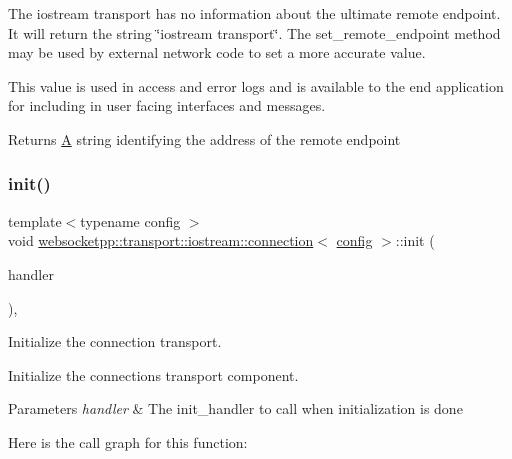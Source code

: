 The iostream transport has no information about the ultimate remote endpoint. It will return the string \char`\"{}iostream transport\char`\"{}. The {\ttfamily set\+\_\+remote\+\_\+endpoint} method may be used by external network code to set a more accurate value.

This value is used in access and error logs and is available to the end application for including in user facing interfaces and messages.

\begin{DoxyReturn}{Returns}
\mbox{\hyperlink{struct_a}{A}} string identifying the address of the remote endpoint 
\end{DoxyReturn}
\mbox{\label{classwebsocketpp_1_1transport_1_1iostream_1_1connection_a771203b134cc012188a07c471907fc76}} 
\subsubsection{\texorpdfstring{init()}{init()}}
{\footnotesize\ttfamily template$<$typename config $>$ \\
void \mbox{\hyperlink{classwebsocketpp_1_1transport_1_1iostream_1_1connection}{websocketpp\+::transport\+::iostream\+::connection}}$<$ \mbox{\hyperlink{classconfig}{config}} $>$\+::init (\begin{DoxyParamCaption}\item[{\mbox{\hyperlink{namespacewebsocketpp_1_1transport_aeae75e675c1a334b3b33ab7120b480a5}{init\+\_\+handler}}}]{handler }\end{DoxyParamCaption})\hspace{0.3cm}{\ttfamily [inline]}, {\ttfamily [protected]}}



Initialize the connection transport. 

Initialize the connection\textquotesingle{}s transport component.


\begin{DoxyParams}{Parameters}
{\em handler} & The {\ttfamily init\+\_\+handler} to call when initialization is done \\
\hline
\end{DoxyParams}
Here is the call graph for this function\+:
\mbox{\label{classwebsocketpp_1_1transport_1_1iostream_1_1connection_aae6fa1869211e9dc8a18d609292bd833}} 
